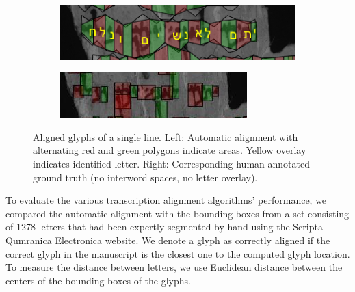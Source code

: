 \begin{figure}[t] \centering\ \begin{subfigure}{0.48\textwidth}
\includegraphics[width=1.0\linewidth]{images/P1094-Fg002-R-line02.PNG}
\label{fig:algn_alignedChars} \end{subfigure} \begin{subfigure}{0.48\textwidth}
	\includegraphics[width=1.0\linewidth]{images/P1094-Fg002-R-line02GT.PNG}
\label{fig:algn_alignedCharsGT} \end{subfigure} \vspace*{-5mm} \caption{Aligned
glyphs of a single line. Left: Automatic alignment with alternating red and
green polygons indicate areas. Yellow overlay indicates identified letter.
Right: Corresponding human annotated ground truth (no interword spaces, no
letter overlay).} \vspace*{-5mm} \label{fig:algn_alignedGlyphs} \end{figure}

%


To evaluate the various transcription alignment algorithms' performance, we
compared the automatic alignment with the bounding boxes from a set consisting
of 1278 letters that had been expertly segmented by hand using the Scripta
Qumranica Electronica website.  We denote a glyph as correctly aligned if the
correct glyph in the manuscript is the closest one to the computed glyph
location.  To measure the distance between letters, we use Euclidean distance
between the centers of the bounding boxes of the glyphs.

